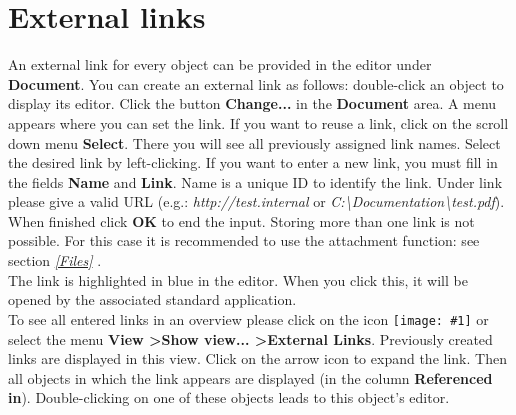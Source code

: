 \documentclass[a4paper,10pt]{book}
\newcommand{\icon}[1]{\texttt{[image: \#1]}}
\begin{document}
\section{External links}
An external link for every object can be provided in the editor under \textbf{Document}. You can create an external link as follows: double-click an object
to display its editor. Click the button \textbf{Change...} in the \textbf{Document} area. A menu appears where you can set the link. If you want to reuse a
link, click on the scroll down menu \textbf{Select}. There you will see all previously assigned link names. Select the desired link by left-clicking.
If you want to enter a new link, you must fill in the fields \textbf{Name} and \textbf{Link}. Name is a unique ID to identify the link. Under link please
give a valid URL (e.g.: {\em http://test.internal} or {\em C:\textbackslash Documentation\textbackslash test.pdf}). When finished click \textbf{OK} to end the input.
Storing more than one link is not possible. For this case it is recommended to use the attachment function: see section {\em \ref{Files} }.
\newline\\
The link is highlighted in blue in the editor. When you click this, it will be opened by the associated standard application.
\newline\\
To see all entered links in an overview please click on the icon \icon{Icon/Richtlinien.png} or select the menu
\textbf{View \textgreater Show view... \textgreater External Links}. Previously created links are displayed in this view. Click on the arrow icon
to expand the link. Then all objects in which the link appears are displayed (in the column \textbf{Referenced in}). Double-clicking on one of these objects
leads to this object’s editor.
\end{document}
